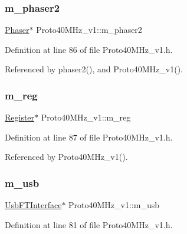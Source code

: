 \subsubsection{\texorpdfstring{m\+\_\+phaser2}{m\_phaser2}}
{\footnotesize\ttfamily \hyperlink{classPhaser}{Phaser}$\ast$ Proto40\+M\+Hz\+\_\+v1\+::m\+\_\+phaser2\hspace{0.3cm}{\ttfamily [private]}}



Definition at line 86 of file Proto40\+M\+Hz\+\_\+v1.\+h.



Referenced by phaser2(), and Proto40\+M\+Hz\+\_\+v1().

\mbox{\label{classProto40MHz__v1_a8533a6455eebc9add8e394ac2cf3af9f}} 
\subsubsection{\texorpdfstring{m\+\_\+reg}{m\_reg}}
{\footnotesize\ttfamily \hyperlink{classRegister}{Register}$\ast$ Proto40\+M\+Hz\+\_\+v1\+::m\+\_\+reg\hspace{0.3cm}{\ttfamily [private]}}



Definition at line 87 of file Proto40\+M\+Hz\+\_\+v1.\+h.



Referenced by Proto40\+M\+Hz\+\_\+v1().

\mbox{\label{classProto40MHz__v1_a954047995f615e6c6b60d178263cc09c}} 
\subsubsection{\texorpdfstring{m\+\_\+usb}{m\_usb}}
{\footnotesize\ttfamily \hyperlink{classUsbFTInterface}{Usb\+F\+T\+Interface}$\ast$ Proto40\+M\+Hz\+\_\+v1\+::m\+\_\+usb\hspace{0.3cm}{\ttfamily [private]}}



Definition at line 81 of file Proto40\+M\+Hz\+\_\+v1.\+h.



